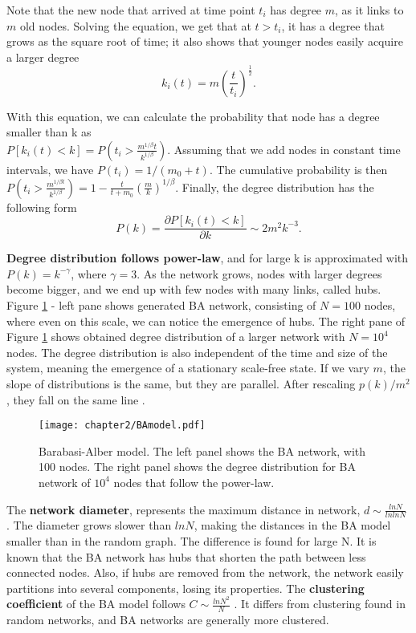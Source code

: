 Note that the new node that arrived at time point $t_i$ has degree $m$, as it links to $m$ old nodes. Solving the equation, we get that at $t>t_i$, it has a degree that grows as the square root of time; it also shows that younger nodes easily acquire a larger degree
\begin{equation}
k_i(t) = m \left(\frac{t}{t_i}\right)^{\frac{1}{2}}.
\end{equation}

With this equation, we can calculate the probability that node has a degree smaller than k \cite{albert2002statistical} as \\ $P[k_i(t)<k] = P(t_i > \frac{m^{1/\beta}t}{k^{1/\beta}})$. Assuming that we add nodes in constant time intervals, we have $P(t_i) = 1/(m_0+t)$. The cumulative probability is then  $P(t_i>\frac{m^{1/\beta t}}{k^{1/\beta}}) = 1 - \frac{t}{t+m_0}\left(\frac{m}{k}\right)^{1/\beta} $.
Finally, the degree distribution has the following form
\begin{equation}
P(k) = \frac{\partial P[k_i(t)<k]}{ \partial k} \sim 2m^2 k^{-3}.
\end{equation}

\textbf{Degree distribution follows power-law}, and for large k is approximated with $P(k) = k^{-\gamma}$, where $\gamma=3$. As the network grows, nodes with larger degrees become bigger, and we end up with few nodes with many links, called hubs. Figure \ref{fig:bamodel} - left pane shows generated BA network, consisting of $N=100$ nodes, where even on this scale, we can notice the emergence of hubs. The right pane of Figure \ref{fig:bamodel} shows obtained degree distribution of a larger network with $N=10^4$ nodes. The degree distribution is also independent of the time and size of the system, meaning the emergence of a stationary scale-free state. If we vary $m$, the slope of distributions is the same, but they are parallel. After rescaling $p(k)/m^2$, they fall on the same line \cite{barabasi2016network}.  

\begin{figure}[h]
	\centering
	\texttt{[image: chapter2/BAmodel.pdf]}
	\caption[Barabasi-Albert model.]{Barabasi-Alber model. The left panel shows the BA network, with 100 nodes. The right panel shows the degree distribution for BA network of $10^4$ nodes that follow the power-law.}
	\label{fig:bamodel}
\end{figure}
 
The \textbf{network diameter}, represents the maximum distance in network, $d \sim \frac{lnN}{lnlnN}$ \cite{bollobas2003mathematical}. The diameter grows slower than $lnN$, making the distances in the BA model smaller than in the random graph. The difference is found for large N. It is known that the BA network has hubs that shorten the path between less connected nodes. Also, if hubs are removed from the network, the network easily partitions into several components, losing its properties. The \textbf{clustering coefficient} of the BA model follows $C \sim \frac{ln N^2}{N}$ \cite{bollobas2003mathematical}. It differs from clustering found in random networks, and BA networks are generally more clustered. 

